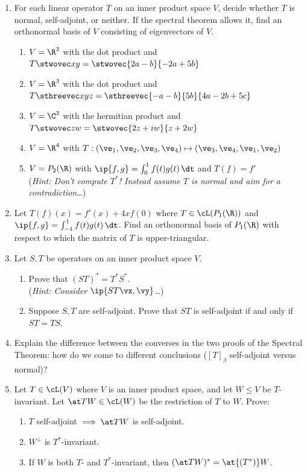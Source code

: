 \begin{exercises}
\begin{enumerate}[label=\thesubsection.\arabic*., align=right]
  \item For each linear operator $T$ on an inner product space $V$, decide whether $T$ is normal, self-adjoint, or neither. If the spectral theorem allows it, find an orthonormal basis of $V$ consisting of eigenvectors of $V$.
  \begin{enumerate}
    \item $V=\R^2$ with the dot product and $T\stwovec xy=\stwovec{2a-b}{-2a+5b}$
    \item $V=\R^3$ with the dot product and $T\sthreevec xyz=\sthreevec{-a-b}{5b}{4a-2b+5c}$
    \item $V=\C^2$ with the hermitian product and $T\stwovec zw=\stwovec{2z+iw}{z+2w}$
    \item $V=\R^4$ with $T:(\ve_1,\ve_2,\ve_3,\ve_4)\mapsto (\ve_3,\ve_4,\ve_1,\ve_2)$
    \item $V=P_2(\R)$ with $\ip{f,g}=\int_0^1f(t)g(t)\,\dt$ and $T(f)=f'$\\
    (\emph{Hint: Don't compute $T^*$! Instead assume $T$ is normal and aim for a contradiction\ldots})
  \end{enumerate}
  
  \item Let $T(f)(x)=f'(x)+4xf(0)$ where $T\in\cL(P_1(\R))$ and $\ip{f,g}=\int_{-1}^1f(t)g(t)\,\dt$. Find an orthonormal basis of $P_1(\R)$ with respect to which the matrix of $T$ is upper-triangular.
  
  \item Let $S,T$ be operators on an inner product space $V$.
  \begin{enumerate}
    \item Prove that $(ST)^*=T^*S^*$.\\
    (\emph{Hint: Consider $\ip{ST\vx,\vy}$\ldots})
    \item Suppose $S,T$ are self-adjoint. Prove that $ST$ is self-adjoint if and only if $ST=TS$.
  \end{enumerate}
  
  \item Explain the difference between the converses in the two proofs of the Spectral Theorem: how do we come to different conclusions ($[T]_\beta$ self-adjoint versus normal)?
  
  \item Let $T\in\cL(V)$ where $V$ is an inner product space, and let $W\le V$ be $T$-invariant. Let $\at TW\in\cL(W)$ be the restriction of $T$ to $W$. Prove:
  \begin{enumerate}
    \item $T$ self-adjoint $\implies \at TW$ is self-adjoint.
    \item $W^\perp$ is $T^*$-invariant.
    \item If $W$ is both $T$- and $T^*$-invariant, then $(\at TW)^*=\at{(T^*)}W$.
  \end{enumerate}
  

\end{enumerate}
\end{exercises}
